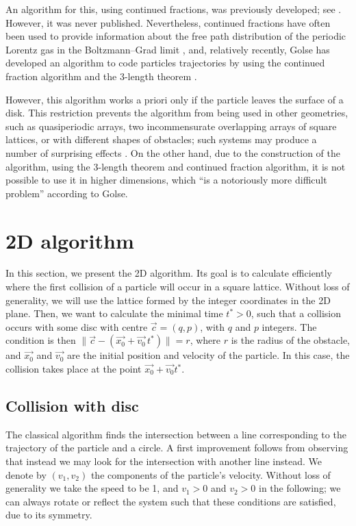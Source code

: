 \documentclass[pre,amsmath,amssymb, twocolumn, showpacs]{revtex4-1}
\begin{document}
An algorithm for this, using continued fractions, was previously developed; see \cite{zacherl1986power}. However, it was never published. Nevertheless,  continued fractions have often been used to provide information about the free path distribution of the periodic Lorentz gas in the Boltzmann--Grad limit \cite{caglioti2003distribution, golse2012recent,boca2007distribution,golse2006periodic,caglioti2008boltzmann, caglioti2010boltzmann, golse2000distribution, bleher1992statistical,chernov1994statistical}, and, relatively recently, Golse has developed an algorithm to code particles trajectories by using the continued fraction algorithm and the 3-length theorem \cite{golse2012recent}. 

However, this algorithm works a priori only if the particle leaves the surface of a disk. This restriction prevents the algorithm from being used in other geometries, such as quasiperiodic arrays, two incommensurate overlapping arrays of square lattices, or with different shapes of obstacles; such systems may produce a number of surprising effects \cite{marklof2014power}.  On the other hand, due to the construction of the algorithm, using the 3-length theorem and continued fraction algorithm, it is not possible to use it in higher dimensions, which ``is a notoriously more difficult problem'' according to Golse.

\section{2D algorithm}
\label{algorithm}

In this section, we present the 2D algorithm.
Its goal is to calculate efficiently where the first collision of a particle will occur in a square lattice. Without loss of generality, we will use the lattice formed by the integer coordinates in the 2D plane. Then, we want to calculate the minimal time $t^{\ast}>0$, such that a collision occurs with some disc with centre $\vec{c}=(q,p)$, with $q$ and $p$ integers. The condition is then 
$\| \vec{c}-(\vec{x_0}+\vec{v_0} \, t^{\ast}) \| = r$, where $r$ is the radius of the obstacle, and $\vec{x_0}$ and $\vec{v_0}$ are the initial position and velocity of the particle. In this case, the collision takes place at the point $\vec{x_0}+\vec{v_0} t^{\ast}$.

\subsection{Collision with disc}
The classical algorithm finds the intersection between a line corresponding to the trajectory of 
the particle and a circle. A first improvement follows from observing that instead we may look for the intersection with another line instead. We denote by $(v_{1}, v_{2})$ the components of the particle's velocity. Without loss of generality we take the speed to be 1, and $v_1>0$ and $v_2>0$ in the following; we can always rotate or reflect the system such that these conditions are satisfied, due to its symmetry.
\end{document}
